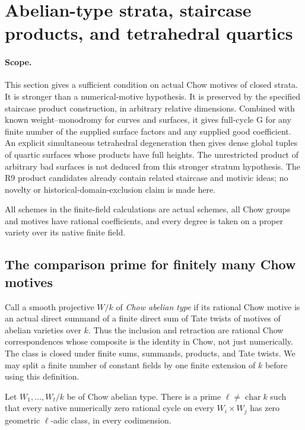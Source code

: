 \section{Abelian-type strata, staircase products, and tetrahedral quartics}
\label{r20at:section}

\paragraph{Scope.}
This section gives a sufficient condition on actual Chow motives of
closed strata.  It is stronger than a numerical-motive hypothesis.
It is preserved by the specified staircase product construction, in
arbitrary relative dimensions.  Combined with known weight--monodromy
for curves and surfaces, it gives full-cycle G for any finite number
of the supplied surface factors and any supplied good coefficient.
An explicit simultaneous tetrahedral degeneration then gives dense
global tuples of quartic surfaces whose products have full heights.
The unrestricted product of arbitrary bad surfaces is not deduced
from this stronger stratum hypothesis.  The R9 product candidates
already contain related staircase and motivic ideas; no novelty or
historical-domain-exclusion claim is made here.

All schemes in the finite-field calculations are actual schemes,
all Chow groups and motives have rational coefficients, and every
degree is taken on a proper variety over its native finite field.

\subsection{The comparison prime for finitely many Chow motives}

Call a smooth projective $W/k$ of \emph{Chow abelian type} if its
rational Chow motive is an actual direct summand of a finite direct
sum of Tate twists of motives of abelian varieties over $k$.
Thus the inclusion and retraction are rational Chow correspondences
whose composite is the identity in Chow, not just numerically.
The class is closed under finite sums, summands, products, and
Tate twists.  We may split a finite number of constant fields by
one finite extension of $k$ before using this definition.

\begin{lemma}
\label{r20at:commonprime}
Let $W_1,\ldots,W_t/k$ be of Chow abelian type.  There is a
prime $\ell\ne\operatorname{char}k$ such that every native
numerically zero rational cycle on every $W_i\times W_j$ has
zero geometric $\ell$-adic class, in every codimension.
\end{lemma}

